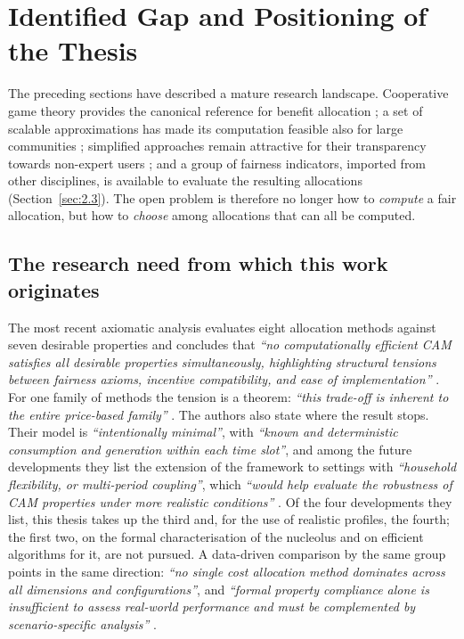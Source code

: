 \section{Identified Gap and Positioning of the Thesis}
\label{sec:gaps}

The preceding sections have described a mature research landscape. Cooperative game theory provides the canonical reference for benefit allocation \cite{shapley1953, moncecchi2020}; a set of scalable approximations has made its computation feasible also for large communities \cite{castro2009, cremers2023, alonsopedrero2024, ferrucci2025}; simplified approaches remain attractive for their transparency towards non-expert users \cite{kulmala2021, fioriti2023}; and a group of fairness indicators, imported from other disciplines, is available to evaluate the resulting allocations (Section~\ref{sec:2.3}). The open problem is therefore no longer how to \emph{compute} a fair allocation, but how to \emph{choose} among allocations that can all be computed.

\subsection*{The research need from which this work originates}

The most recent axiomatic analysis evaluates eight allocation methods against seven desirable properties and concludes that \textit{``no computationally efficient CAM satisfies all desirable properties simultaneously, highlighting structural tensions between fairness axioms, incentive compatibility, and ease of implementation''} \cite{gonzalezAsenjo2025}. For one family of methods the tension is a theorem: \textit{``this trade-off is inherent to the entire price-based family''} \cite{gonzalezAsenjo2025}. The authors also state where the result stops. Their model is \textit{``intentionally minimal''}, with \textit{``known and deterministic consumption and generation within each time slot''}, and among the future developments they list the extension of the framework to settings with \textit{``household flexibility, or multi-period coupling''}, which \textit{``would help evaluate the robustness of CAM properties under more realistic conditions''} \cite{gonzalezAsenjo2025}. Of the four developments they list, this thesis takes up the third and, for the use of realistic profiles, the fourth; the first two, on the formal characterisation of the nucleolus and on efficient algorithms for it, are not pursued. A data-driven comparison by the same group points in the same direction: \textit{``no single cost allocation method dominates across all dimensions and configurations''}, and \textit{``formal property compliance alone is insufficient to assess real-world performance and must be complemented by scenario-specific analysis''} \cite{gonzalezAsenjo2026}.


